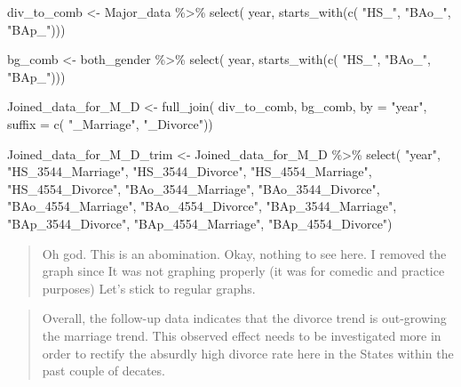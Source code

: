 \documentclass[
]{article}
\newenvironment{Shaded}{\begin{snugshade}}{\end{snugshade}}
\newcommand{\AttributeTok}[1]{\textcolor[rgb]{0.77,0.63,0.00}{#1}}
\newcommand{\FunctionTok}[1]{\textcolor[rgb]{0.00,0.00,0.00}{#1}}
\newcommand{\NormalTok}[1]{#1}
\newcommand{\OtherTok}[1]{\textcolor[rgb]{0.56,0.35,0.01}{#1}}
\newcommand{\SpecialCharTok}[1]{\textcolor[rgb]{0.00,0.00,0.00}{#1}}
\newcommand{\StringTok}[1]{\textcolor[rgb]{0.31,0.60,0.02}{#1}}
\begin{document}
\begin{Shaded}
\begin{Highlighting}[]
\NormalTok{div\_to\_comb }\OtherTok{\textless{}{-}}\NormalTok{ Major\_data }\SpecialCharTok{\%\textgreater{}\%}
  \FunctionTok{select}\NormalTok{(}
\NormalTok{    year, }
    \FunctionTok{starts\_with}\NormalTok{(}\FunctionTok{c}\NormalTok{(}
      \StringTok{"HS\_"}\NormalTok{, }
      \StringTok{"BAo\_"}\NormalTok{, }
      \StringTok{"BAp\_"}\NormalTok{)))}

\NormalTok{bg\_comb }\OtherTok{\textless{}{-}}\NormalTok{ both\_gender }\SpecialCharTok{\%\textgreater{}\%}
  \FunctionTok{select}\NormalTok{(}
\NormalTok{    year, }
    \FunctionTok{starts\_with}\NormalTok{(}\FunctionTok{c}\NormalTok{(}
      \StringTok{"HS\_"}\NormalTok{, }
      \StringTok{"BAo\_"}\NormalTok{, }
      \StringTok{"BAp\_"}\NormalTok{)))}

\NormalTok{Joined\_data\_for\_M\_D }\OtherTok{\textless{}{-}} \FunctionTok{full\_join}\NormalTok{(}
\NormalTok{  div\_to\_comb,}
\NormalTok{  bg\_comb, }
  \AttributeTok{by =} \StringTok{"year"}\NormalTok{, }
  \AttributeTok{suffix =} \FunctionTok{c}\NormalTok{(}
    \StringTok{"\_Marriage"}\NormalTok{, }
    \StringTok{"\_Divorce"}\NormalTok{))}

\NormalTok{Joined\_data\_for\_M\_D\_trim }\OtherTok{\textless{}{-}}\NormalTok{ Joined\_data\_for\_M\_D }\SpecialCharTok{\%\textgreater{}\%} 
  \FunctionTok{select}\NormalTok{(}
    \StringTok{"year"}\NormalTok{,}
    \StringTok{"HS\_3544\_Marriage"}\NormalTok{,}
    \StringTok{"HS\_3544\_Divorce"}\NormalTok{,}
    \StringTok{"HS\_4554\_Marriage"}\NormalTok{,}
    \StringTok{"HS\_4554\_Divorce"}\NormalTok{,}
    \StringTok{"BAo\_3544\_Marriage"}\NormalTok{,}
    \StringTok{"BAo\_3544\_Divorce"}\NormalTok{,}
    \StringTok{"BAo\_4554\_Marriage"}\NormalTok{,}
    \StringTok{"BAo\_4554\_Divorce"}\NormalTok{,}
    \StringTok{"BAp\_3544\_Marriage"}\NormalTok{,}
    \StringTok{"BAp\_3544\_Divorce"}\NormalTok{,}
    \StringTok{"BAp\_4554\_Marriage"}\NormalTok{,}
    \StringTok{"BAp\_4554\_Divorce"}\NormalTok{)}
\end{Highlighting}
\end{Shaded}

\begin{quote}
Oh god. This is an abomination. Okay, nothing to see here. I removed the
graph since It was not graphing properly (it was for comedic and
practice purposes) Let's stick to regular graphs.
\end{quote}

\begin{quote}
Overall, the follow-up data indicates that the divorce trend is
out-growing the marriage trend. This observed effect needs to be
investigated more in order to rectify the absurdly high divorce rate
here in the States within the past couple of decates.
\end{quote}
\end{document}
